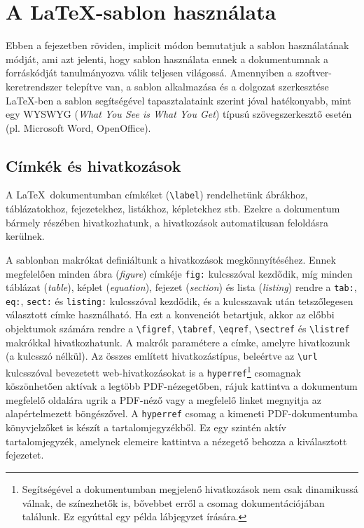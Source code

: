 \chapter{A \LaTeX-sablon használata}
Ebben a fejezetben röviden, implicit módon bemutatjuk a sablon használatának módját, ami azt jelenti, hogy sablon használata ennek a dokumentumnak a forráskódját tanulmányozva válik teljesen világossá. Amennyiben a szoftver-keretrendszer telepítve van, a sablon alkalmazása és a dolgozat szerkesztése \LaTeX-ben a sablon segítségével tapasztalataink szerint jóval hatékonyabb, mint egy WYSWYG (\emph{What You See is What You Get}) típusú szövegszerkesztő esetén (pl. Microsoft Word, OpenOffice).

\section{Címkék és hivatkozások}
A \LaTeX~dokumentumban címkéket (\verb+\label+) rendelhetünk ábrákhoz, táblázatokhoz, fejezetekhez, listákhoz, képletekhez stb. Ezekre a dokumentum bármely részében hivatkozhatunk, a hivatkozások automatikusan feloldásra kerülnek.

A sablonban makrókat definiáltunk a hivatkozások megkönnyítéséhez. Ennek megfelelően minden ábra (\emph{figure}) címkéje \verb+fig:+ kulcsszóval kezdődik, míg minden táblázat (\emph{table}), képlet (\emph{equation}), fejezet (\emph{section}) és lista (\emph{listing}) rendre a \verb+tab:+, \verb+eq:+, \verb+sect:+ és \verb+listing:+ kulcsszóval kezdődik, és a kulcsszavak után tetszőlegesen választott címke használható. Ha ezt a konvenciót betartjuk, akkor az előbbi objektumok számára rendre a \verb+\figref+, \verb+\tabref+, \verb+\eqref+, \verb+\sectref+ és \verb+\listref+ makrókkal hivatkozhatunk. A makrók paramétere a címke, amelyre hivatkozunk (a kulcsszó nélkül). Az összes említett hivatkozástípus, beleértve az \verb+\url+ kulcsszóval bevezetett web-hivatkozásokat is a  \verb+hyperref+\footnote{Segítségével a dokumentumban megjelenő hivatkozások nem csak dinamikussá válnak, de színezhetők is, bővebbet erről a csomag dokumentációjában találunk. Ez egyúttal egy példa lábjegyzet írására.} csomagnak köszönhetően aktívak a legtöbb PDF-nézegetőben, rájuk kattintva a dokumentum megfelelő oldalára ugrik a PDF-néző vagy a megfelelő linket megnyitja az alapértelmezett böngészővel. A \verb+hyperref+ csomag a kimeneti PDF-dokumentumba könyvjelzőket is készít a tartalomjegyzékből. Ez egy szintén aktív tartalomjegyzék, amelynek elemeire kattintva a nézegető behozza a kiválasztott fejezetet.

